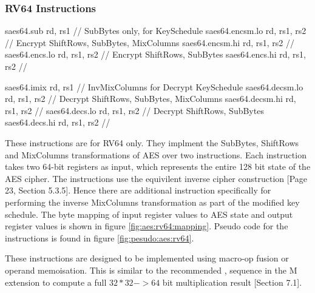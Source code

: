 
\newpage
\subsubsection{RV64 Instructions}

\begin{cryptoisa}
saes64.sub      rd, rs1        // SubBytes only, for KeySchedule
saes64.encsm.lo rd, rs1, rs2   // Encrypt ShiftRows, SubBytes, MixColumns
saes64.encsm.hi rd, rs1, rs2   //
saes64.encs.lo  rd, rs1, rs2   // Encrypt ShiftRows, SubBytes
saes64.encs.hi  rd, rs1, rs2   //

saes64.imix     rd, rs1        // InvMixColumns for Decrypt KeySchedule
saes64.decsm.lo rd, rs1, rs2   // Decrypt ShiftRows, SubBytes, MixColumns
saes64.decsm.hi rd, rs1, rs2   //
saes64.decs.lo  rd, rs1, rs2   // Decrypt ShiftRows, SubBytes
saes64.decs.hi  rd, rs1, rs2   //
\end{cryptoisa}

These instructions are for RV64 only.
They implment the SubBytes, ShiftRows and MixColumns transformations of AES
over two instructions.
Each instruction takes two 64-bit registers as input, which represents
the entire 128 bit state of the AES cipher.
The instructions use the equivilent inverse cipher construction
\cite{nist:fips:197}[Page 23, Section 5.3.5].
Hence there are additional instruction specifically for performing the
inverse MixColumns transformation as part of the modified key schedule.
The byte mapping of input register values to AES state and output register
values is shown in figure \ref{fig:aes:rv64:mapping}.
Pseudo code for the instructions is found in figure
\ref{fig:pesudo:aes:rv64}.

These instructions are designed to be implemented using macro-op fusion or
operand memoisation.
This is similar to the recommended , 
sequence in the M extension to compute a full $32*32->64$ bit
multiplication result \cite{riscv:spec:user}[Section 7.1].

